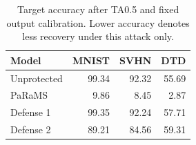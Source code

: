 \begin{table}[t]
\centering
\caption{Target accuracy after TA0.5 and fixed output calibration. Lower accuracy denotes less recovery under this attack only.}
\begin{tabular}{lrrr}
\toprule
Model & MNIST & SVHN & DTD \\
\midrule
Unprotected & 99.34 & 92.32 & 55.69 \\
PaRaMS & 9.86 & 8.45 & 2.87 \\
Defense 1 & 99.35 & 92.24 & 57.71 \\
Defense 2 & 89.21 & 84.56 & 59.31 \\
\bottomrule
\end{tabular}
\end{table}
